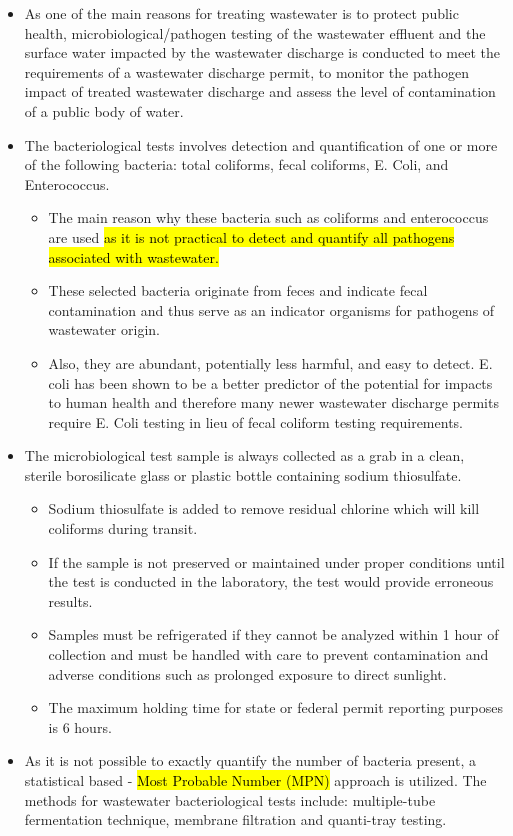 \begin{itemize}
				\begin{itemize}
					\item As one of the main reasons for treating wastewater is to protect public health, microbiological/pathogen testing of the wastewater effluent and the surface water impacted by the wastewater discharge is conducted to meet the requirements of a wastewater discharge permit, to monitor the pathogen impact of treated wastewater discharge and assess the level of contamination of a public body of water.
					\item The bacteriological tests involves detection and quantification of one or more of the following bacteria:  total coliforms, fecal coliforms, E. Coli, and Enterococcus.  
					      \begin{itemize}
					      	\item The main reason why these bacteria such as coliforms and enterococcus are used \hl{as it is not practical to detect and quantify all pathogens associated with wastewater.}  
					      	\item These selected bacteria originate from feces and indicate fecal contamination and thus serve as an indicator organisms for pathogens of wastewater origin.  
					      	\item Also, they are abundant, potentially less harmful, and easy to detect.  E. coli has been shown to be a better predictor of the potential for impacts to human health and therefore many newer wastewater discharge permits require E. Coli testing in lieu of fecal coliform testing requirements.
					      \end{itemize}
					\item The microbiological test sample is always collected as a grab in a clean, sterile borosilicate glass or plastic bottle containing sodium thiosulfate. 
					      \begin{itemize}
					      	\item Sodium thiosulfate is added to remove residual chlorine which will kill coliforms during transit. 
					      	\item If the sample is not preserved or maintained under proper conditions until the test is conducted in the laboratory, the test would provide erroneous results.
					      	\item Samples must be refrigerated if they cannot be analyzed within 1 hour of collection and must be handled with care to prevent contamination and adverse conditions such as prolonged exposure to direct sunlight.
					      	\item The maximum holding time for state or federal permit reporting purposes is 6 hours. 
					      \end{itemize} 
					\item As it is not possible to exactly quantify the number of bacteria present, a statistical based - \hl{Most Probable Number (MPN)} approach is utilized.  The methods for wastewater bacteriological tests include:  multiple-tube fermentation technique, membrane filtration and quanti-tray testing. 
				\end{itemize}
			\end{itemize}

